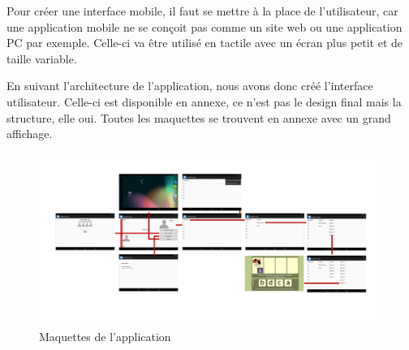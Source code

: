 Pour créer une interface mobile, il faut se mettre à la place de l'utilisateur, car une application mobile ne se conçoit pas comme un site web ou une application PC par exemple. Celle-ci va être utilisé en tactile avec un écran plus petit et de taille variable.


En suivant l'architecture de l'application, nous avons donc créé l'interface utilisateur. Celle-ci est disponible en annexe, ce n'est pas le design final mais la structure, elle oui. Toutes les maquettes se trouvent en annexe avec un grand affichage.

\begin{figure}[H]
\begin{center}
\includegraphics[width=20cm,angle=90]{images/pepit_wireframe}
\end{center}
\caption{Maquettes de l'application}
\label{Maquettes de l'application}
\end{figure}
